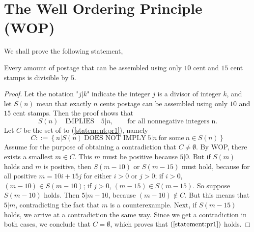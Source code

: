 \chapter{The Well Ordering Principle (WOP)}

\begin{pr}
    We shall prove the following statement,
    \begin{lemPr}
        Every amount of postage that can be assembled using only $10$ cent
        and $15$ cent stamps is divisible by $5$.
    \end{lemPr}

    \begin{proof}
        Let the notation "$j\left|\right.k$" indicate the integer $j$
        is a divisor of integer $k$, and let $S(n)$ mean that exactly $n$ cents
        postage can be assembled using only $10$ and $15$ cent stamps. Then
        the proof shows that
        \begin{equation} \label{statement:pr1}
            S(n) \quad \text{IMPLIES} \quad 5 \left|\right. n, \qquad \text{for all nonnegative integers n.}
        \end{equation}
        Let $C$ be the set of  to (\ref{statement:pr1}), namely
        \begin{equation*}
            C ::= \left\{ n \left|\right. S(n) \ \text{DOES NOT IMPLY} \ 5 \left|\right. n \ \text{for some} \ n \in S(n) \right\}
        \end{equation*}
        Assume for the purpose of obtaining a contradiction that $C \neq \emptyset$.
        By WOP, there exists a smallest $m \in C$. This $m$ must be positive
        because $5 \left|\right. 0$.
        \beautyBr
        But if $S(m)$ holds and $m$ is positive, then $S(m - 10)$ or $S(m - 15)$
        must hold, because for all positive $m = 10i + 15j$ for either $i > 0$ or $j > 0$; if
        $i > 0$, $(m - 10) \in S(m - 10)$; if $j > 0$, $(m - 15) \in S(m - 15)$.
        \beautyBr
        So suppose $S(m - 10)$ holds. Then $5 \left|\right. m - 10$, because $(m - 10) \notin C$.
        \beautyBr
        But this means that $5 \left|\right. m$, contradicting the fact that
        $m$ is a counterexample.
        \beautyBr
        Next, if $S(m - 15)$ holds, we arrive at a contradiction the same way.
        \beautyBr
        Since we get a contradiction in both cases, we conclude that $C = \emptyset$,
        which proves that $(\ref{statement:pr1})$ holds.
    \end{proof}
\end{pr}

